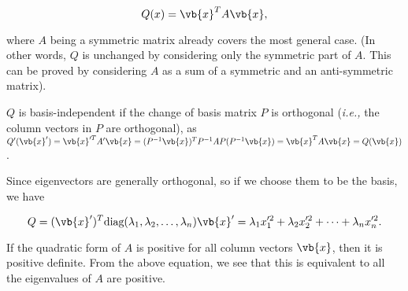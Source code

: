 \documentclass[a4paper,12pt]{report}
\begin{document}
\begin{equation}
    Q(x) = \vb{x} ^T A\vb{x} ,
\end{equation}

where \(A\) being a symmetric matrix already covers the most general case. (In other words, \(Q\) is unchanged by considering only the symmetric part of \(A\). This can be proved by considering \(A\) as a sum of a symmetric and an anti-symmetric matrix). 

\(Q\) is basis-independent if the change of basis matrix \(P\) is orthogonal (\textit{i.e.,} the column vectors in \(P\) are orthogonal), as \(Q'(\vb{x} ') = \vb{x} '^TA'\vb{x} = (P^{-1} \vb{x} )^TP^{-1} AP(P^{-1} \vb{x} ) = \vb{x} ^TA\vb{x} = Q(\vb{x} )\).

Since eigenvectors are generally orthogonal, so if we choose them to be the basis, we have 

\begin{equation}
    Q = (\vb{x}') ^T\text{diag}(\lambda _{1},\lambda _{2}, \ldots ,\lambda _{n}   )\vb{x} ' = \lambda _{1}x'^2_1+ \lambda _{2}x'^2_2  + \cdots + \lambda _{n}x'^2_{n} .    
\end{equation}

If the quadratic form of \(A\) is positive for all column vectors \(\vb{x} \), then it is positive definite. From the above equation, we see that this is equivalent to all the eigenvalues of \(A\) are positive.  
\end{document}
